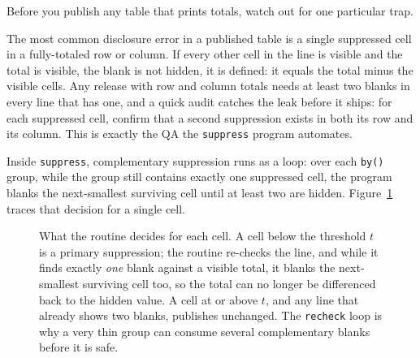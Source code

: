 \documentclass[
    a4paper,
    fontsize=10pt,
    twoside=true,
    numbers=noenddot,
]{kaobook}
\newenvironment{vizcallout}[1][Visualization to build]{%
    \begin{vizbox}[frametitle={#1}]%
}{%
    \end{vizbox}%
}
\begin{document}
Before you publish any table that prints totals, watch out for one particular trap.

\begin{vizcallout}[Suppression that leaks: the single-blank trap]
The most common disclosure error in a published table is a single suppressed cell in a fully-totaled row or column. If every other cell in the line is visible and the total is visible, the blank is not hidden, it is defined: it equals the total minus the visible cells. Any release with row and column totals needs at least two blanks in every line that has one, and a quick audit catches the leak before it ships: for each suppressed cell, confirm that a second suppression exists in both its row and its column. This is exactly the QA the \texttt{suppress} program automates.
\end{vizcallout}

Inside \texttt{suppress}, complementary suppression runs as a loop: over each \texttt{by()} group, while the group still contains exactly one suppressed cell, the program blanks the next-smallest surviving cell until at least two are hidden. Figure~\ref{fig:ch14-viz-suppress} traces that decision for a single cell.

\begin{figure}[htbp]
\centering
{}
\caption[The suppression decision, cell by cell]{What the routine decides for each cell. A cell below the threshold $t$ is a primary suppression; the routine re-checks the line, and while it finds exactly \emph{one} blank against a visible total, it blanks the next-smallest surviving cell too, so the total can no longer be differenced back to the hidden value. A cell at or above $t$, and any line that already shows two blanks, publishes unchanged. The \texttt{recheck} loop is why a very thin group can consume several complementary blanks before it is safe.}
\label{fig:ch14-viz-suppress}
\end{figure}
\end{document}
